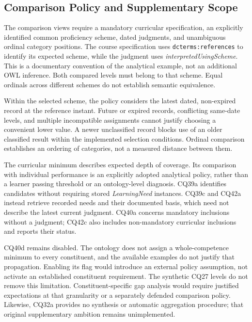 \subsection{Comparison Policy and Supplementary Scope}

The comparison views require a mandatory curricular specification, an
explicitly identified common proficiency scheme, dated judgments, and
unambiguous ordinal category positions. The course specification uses
\texttt{dcterms:references} to identify its expected scheme, while the
judgment uses \textit{interpretedUsingScheme}. This is a documentary
convention of the analytical example, not an additional OWL inference.
Both compared levels must belong to that scheme. Equal ordinals across
different schemes do not establish semantic equivalence.

Within the selected scheme, the policy considers the latest dated,
non-expired record at the reference instant. Future or expired records,
conflicting same-date levels, and multiple incompatible assignments
cannot justify choosing a convenient lower value. A newer unclassified
record blocks use of an older classified result within the implemented
selection conditions. Ordinal comparison establishes an ordering of
categories, not a measured distance between them.

The curricular minimum describes expected depth of coverage. Its
comparison with individual performance is an explicitly adopted
analytical policy, rather than a learner passing threshold or an
ontology-level diagnosis. CQ39a identifies candidates without requiring
stored \textit{LearningNeed} instances. CQ39c and CQ42a instead retrieve
recorded needs and their documented basis, which need not describe the
latest current judgment. CQ40a concerns mandatory inclusions without a
judgment; CQ42c also includes non-mandatory curricular inclusions and
reports their status.

CQ40d remains disabled. The ontology does not assign a whole-competence
minimum to every constituent, and the available examples do not justify
that propagation. Enabling its flag would introduce an external policy
assumption, not activate an established constituent requirement. The
synthetic CQ27 levels do not remove this limitation. Constituent-specific
gap analysis would require justified expectations at that granularity
or a separately defended comparison policy. Likewise, CQ32a provides
no synthesis or automatic aggregation procedure; that original
supplementary ambition remains unimplemented.

